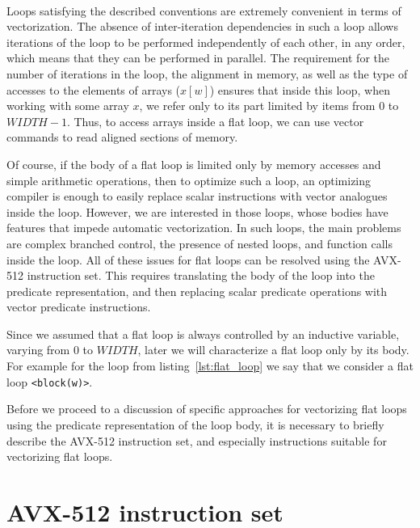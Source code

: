 \documentclass[
11pt,%
tightenlines,%
twoside,%
onecolumn,%
nofloats,%
nobibnotes,%
nofootinbib,%
superscriptaddress,%
noshowpacs,%
centertags]%
{revtex4}
\begin{document}
\

Loops satisfying the described conventions are extremely convenient in terms of vectorization.
The absence of inter-iteration dependencies in such a loop allows iterations of the loop to be performed independently of each other, in any order, which means that they can be performed in parallel.
The requirement for the number of iterations in the loop, the alignment in memory, as well as the type of accesses to the elements of arrays ($x[w]$) ensures that inside this loop, when working with some array $x$, we refer only to its part limited by items from $0$ to $WIDTH-1$.
Thus, to access arrays inside a flat loop, we can use vector commands to read aligned sections of memory.

Of course, if the body of a flat loop is limited only by memory accesses and simple arithmetic operations, then to optimize such a loop, an optimizing compiler is enough to easily replace scalar instructions with vector analogues inside the loop.
However, we are interested in those loops, whose bodies have features that impede automatic vectorization.
In such loops, the main problems are complex branched control, the presence of nested loops, and function calls inside the loop.
All of these issues for flat loops can be resolved using the AVX-512 instruction set.
This requires translating the body of the loop into the predicate representation, and then replacing scalar predicate operations with vector predicate instructions.

Since we assumed that a flat loop is always controlled by an inductive variable, varying from $0$ to $WIDTH$, later we will characterize a flat loop only by its body.
For example for the loop from listing~\ref{lst:flat_loop} we say that we consider a flat loop \texttt{<block(w)>}.

Before we proceed to a discussion of specific approaches for vectorizing flat loops using the predicate representation of the loop body, it is necessary to briefly describe the AVX-512 instruction set, and especially instructions suitable for vectorizing flat loops.

\section{AVX-512 instruction set}
\end{document}
